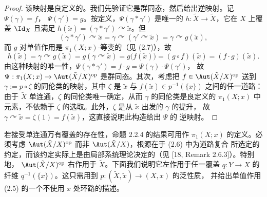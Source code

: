 \begin{proof}
该映射是良定义的。我们先验证它是群同态，然后给出逆映射。记 $\Psi(\gamma)=f$，
$\Psi(\gamma')=g$。按定义，$\Psi(\gamma*\gamma')$ 是唯一的 $h:\tilde X\to\tilde X$，它在
$X$ 上覆盖 $\Id_X$ 且满足 $h(\tilde x)=(\gamma*\gamma')\curvearrowright\tilde x$。但
\[
(\gamma*\gamma')\curvearrowright\tilde x
=\gamma\curvearrowright(\gamma'\curvearrowright\tilde x)
=\gamma\curvearrowright g(\tilde x),
\]
而 $g$ 对单值作用是 $\pi_1(X;x)$-等变的（见 (2.7)），故
\[
h(\tilde x)=\gamma\curvearrowright g(\tilde x)
=g(\gamma\curvearrowright\tilde x)=g\bigl(f(\tilde x)\bigr)
=(g\circ f)(\tilde x)=(f\cdot g)(\tilde x).
\]
由这种映射的唯一性，$\Psi(\gamma*\gamma')=f\cdot g=\Psi(\gamma)\cdot\Psi(\gamma')$，
故 $\Psi:\pi_1(X;x)\to\Aut(\tilde X/X)^{\mathrm{op}}$ 是群同态。其次，考虑把
$f\in\Aut(\tilde X/X)^{\mathrm{op}}$ 送到 $\gamma:=p\circ\zeta$ 的同伦类的映射，其中
$\zeta$ 是 $\tilde x$ 与 $f(\tilde x)\in p^{-1}(\{x\})$ 之间的任一道路：由于 $\tilde X$
单连通，$\zeta$ 的同伦类唯一确定，从而 $\gamma$ 的同伦类是良定义的 $\pi_1(X;x)$ 中
元素，不依赖于 $\zeta$ 的选取。此外，$\zeta$ 是从 $\tilde x$ 出发的 $\gamma$ 的提升，
故 $\gamma\curvearrowright\tilde x=\zeta(1)=f(\tilde x)$，这直接说明此构造给出 $\Psi$ 的
逆映射。
\end{proof}

若接受单连通万有覆盖的存在性，命题 2.2.4 的结果可用作 $\pi_1(X;x)$ 的定义。必须考虑
$\Aut(\tilde X/X)^{\mathrm{op}}$ 而非 $\Aut(\tilde X/X)$，根源在于 (2.6) 中为道路复合
所选定的约定，而该约定实际上是由局部系统理论决定的（见 [18, Remark 2.6.3]）。特别地，
$\Aut(\tilde X/X)^{\mathrm{op}}$ 右作用于 $\tilde X$。下面我们说明它左作用于任一覆盖
$q:Y\to X$ 的纤维 $q^{-1}(\{x\})$。这只需用到 $p:(\tilde X,\tilde x)\to(X,x)$ 的泛性质，
并给出单值作用 (2.5) 的一个不使用 $x$ 处环路的描述。
